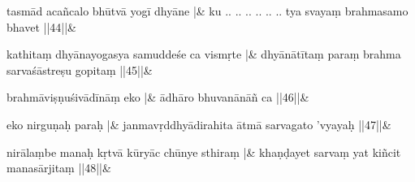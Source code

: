 \documentclass[a4paper,12pt]{article}
\begin{document}


\stanza 
{}tasmād acañcalo bhūtvā yogī dhyāne  |&
ku .. .. .. .. .. .. tya svayaṃ brahmasamo bhavet ||44||\& 

\stanza
{}kathitaṃ dhyānayogasya samuddeśe ca vismṛte |&
dhyānātītaṃ paraṃ brahma sarvaśāstreṣu gopitaṃ ||45||\&


\stanza
{}brahmāviṣṇuśivādīnāṃ eko    |&
ādhāro bhuvanānāñ ca   ||46||\&


\stanza
{}eko   nirguṇaḥ  paraḥ |&
janmavṛddhyādirahita ātmā sarvagato 'vyayaḥ ||47||\&



\stanza
{}nirālaṃbe manaḥ kṛtvā kūryāc chūnye  sthiraṃ |&
 khaṇḍayet sarvaṃ yat kiñcit manasārjitaṃ ||48||\&

\end{document}

